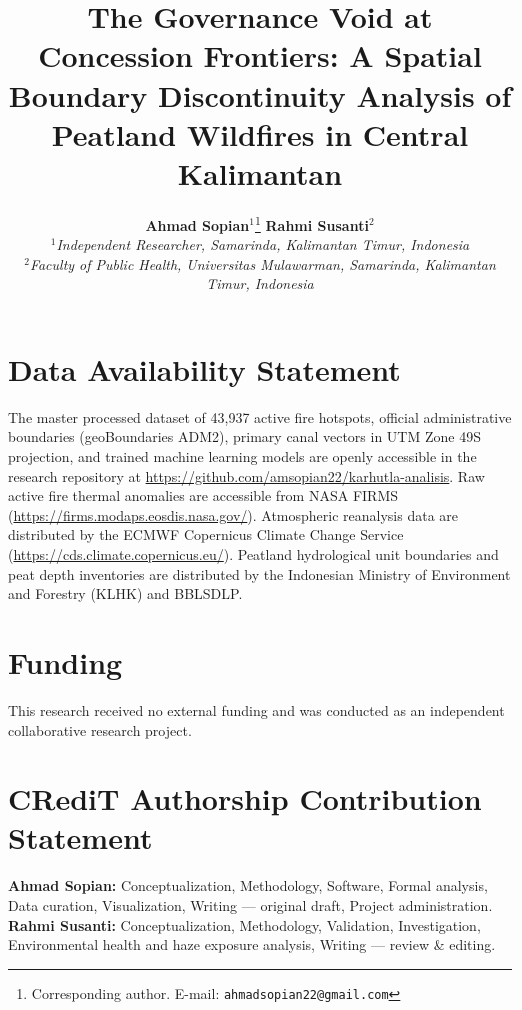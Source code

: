 \documentclass[11pt,a4paper]{article}
\title{\vspace{-2.5em}\LARGE\textbf{\color{navyblue}The Governance Void at Concession Frontiers: A Spatial Boundary Discontinuity Analysis of Peatland Wildfires in Central Kalimantan}}
\author{
    \textbf{\large Ahmad Sopian}$^1$\thanks{Corresponding author. E-mail: \texttt{ahmadsopian22@gmail.com}} \qquad
    \textbf{\large Rahmi Susanti}$^2$\\[0.35em]
    \small $^1$\textit{Independent Researcher, Samarinda, Kalimantan Timur, Indonesia}\\[0.15em]
    \small $^2$\textit{Faculty of Public Health, Universitas Mulawarman, Samarinda, Kalimantan Timur, Indonesia}
}
\date{\vspace{-2.5em}}
\begin{document}
\maketitle
\thispagestyle{plain}
\vspace{-1.2em}



\clearpage











\section*{Data Availability Statement}
The master processed dataset of 43,937 active fire hotspots, official administrative boundaries (geoBoundaries ADM2), primary canal vectors in UTM Zone 49S projection, and trained machine learning models are openly accessible in the research repository at \url{https://github.com/amsopian22/karhutla-analisis}. Raw active fire thermal anomalies are accessible from NASA FIRMS (\url{https://firms.modaps.eosdis.nasa.gov/}). Atmospheric reanalysis data are distributed by the ECMWF Copernicus Climate Change Service (\url{https://cds.climate.copernicus.eu/}). Peatland hydrological unit boundaries and peat depth inventories are distributed by the Indonesian Ministry of Environment and Forestry (KLHK) and BBLSDLP.

\section*{Funding}
This research received no external funding and was conducted as an independent collaborative research project.

\section*{CRediT Authorship Contribution Statement}
\textbf{Ahmad Sopian:} Conceptualization, Methodology, Software, Formal analysis, Data curation, Visualization, Writing --- original draft, Project administration. \textbf{Rahmi Susanti:} Conceptualization, Methodology, Validation, Investigation, Environmental health and haze exposure analysis, Writing --- review \& editing.
\end{document}
